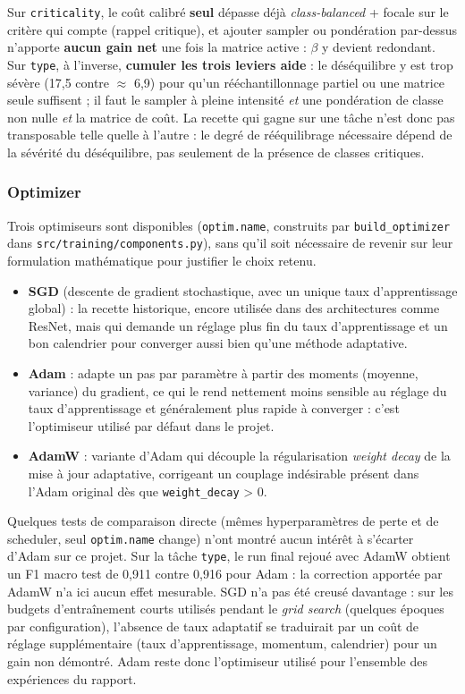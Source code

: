 Sur \texttt{criticality}, le coût calibré \textbf{seul} dépasse déjà \emph{class-balanced} + focale sur le critère qui compte (rappel critique), et ajouter sampler ou pondération par-dessus n’apporte \textbf{aucun gain net} une fois la matrice active : $\beta$ y devient redondant.
Sur \texttt{type}, à l’inverse, \textbf{cumuler les trois leviers aide} : le déséquilibre y est trop sévère (17,5 contre $\approx$ 6,9) pour qu’un rééchantillonnage partiel ou une matrice seule suffisent ; il faut le sampler à pleine intensité \emph{et} une pondération de classe non nulle \emph{et} la matrice de coût.
La recette qui gagne sur une tâche n’est donc pas transposable telle quelle à l’autre : le degré de rééquilibrage nécessaire dépend de la sévérité du déséquilibre, pas seulement de la présence de classes critiques.

\subsubsection{Optimizer}
\label{sec:optimizer}

Trois optimiseurs sont disponibles (\texttt{optim.name}, construits par \texttt{build\_optimizer} dans \texttt{src/training/components.py}), sans qu’il soit nécessaire de revenir sur leur formulation mathématique pour justifier le choix retenu.

\begin{itemize}
  \item \textbf{SGD} \parencite{bottou2010sgd} (descente de gradient stochastique, avec un unique taux d’apprentissage global) : la recette historique, encore utilisée dans des architectures comme ResNet, mais qui demande un réglage plus fin du taux d’apprentissage et un bon calendrier pour converger aussi bien qu’une méthode adaptative.
  \item \textbf{Adam} \parencite{kingma2015adam} : adapte un pas par paramètre à partir des moments (moyenne, variance) du gradient, ce qui le rend nettement moins sensible au réglage du taux d’apprentissage et généralement plus rapide à converger : c’est l’optimiseur utilisé par défaut dans le projet.
  \item \textbf{AdamW} \parencite{loshchilov2019decoupled} : variante d’Adam qui découple la régularisation \emph{weight decay} de la mise à jour adaptative, corrigeant un couplage indésirable présent dans l’Adam original dès que \texttt{weight\_decay} > 0.
\end{itemize}

Quelques tests de comparaison directe (mêmes hyperparamètres de perte et de scheduler, seul \texttt{optim.name} change) n’ont montré aucun intérêt à s’écarter d’Adam sur ce projet.
Sur la tâche \texttt{type}, le run final rejoué avec AdamW obtient un F1 macro test de 0,911 contre 0,916 pour Adam : la correction apportée par AdamW n’a ici aucun effet mesurable.
SGD n’a pas été creusé davantage : sur les budgets d’entraînement courts utilisés pendant le \emph{grid search} (quelques époques par configuration), l’absence de taux adaptatif se traduirait par un coût de réglage supplémentaire (taux d’apprentissage, momentum, calendrier) pour un gain non démontré.
Adam reste donc l’optimiseur utilisé pour l’ensemble des expériences du rapport.

